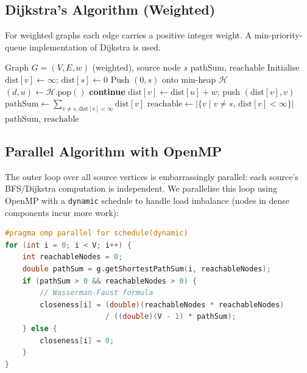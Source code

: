 \documentclass[12pt,a4paper]{article}
\begin{document}
\subsection{Dijkstra's Algorithm (Weighted)}
For weighted graphs each edge carries a positive integer weight.  A min-priority-queue
implementation of Dijkstra is used.

\begin{algorithm}[H]
\caption{Dijkstra-based Closeness Centrality (single source)}
\label{alg:dijkstra}
\begin{algorithmic}[1]
\Require Graph $G=(V,E,w)$ (weighted), source node $s$
\Ensure $\mathrm{pathSum}$, $\mathrm{reachable}$
\State Initialise $\mathrm{dist}[v] \gets \infty$; $\mathrm{dist}[s] \gets 0$
\State Push $(0, s)$ onto min-heap $\mathcal{H}$
  \State $(d, u) \gets \mathcal{H}.\mathrm{pop}()$
   \textbf{continue} \EndIf
      \State $\mathrm{dist}[v] \gets \mathrm{dist}[u] + w$; push $(\mathrm{dist}[v], v)$
    \EndIf
  \EndFor
\EndWhile
\State $\mathrm{pathSum} \gets \sum_{v \neq s, \mathrm{dist}[v] < \infty} \mathrm{dist}[v]$
\State $\mathrm{reachable} \gets |\{v \mid v \neq s,\, \mathrm{dist}[v] < \infty\}|$
\State \Return $\mathrm{pathSum}$, $\mathrm{reachable}$
\end{algorithmic}
\end{algorithm}

\subsection{Parallel Algorithm with OpenMP}
The outer loop over all source vertices is embarrassingly parallel: each source's BFS/Dijkstra
computation is independent.  We parallelise this loop using OpenMP with a \texttt{dynamic}
schedule to handle load imbalance (nodes in dense components incur more work):

\begin{lstlisting}[language=C++, caption={Parallel outer loop in main.cpp}]
#pragma omp parallel for schedule(dynamic)
for (int i = 0; i < V; i++) {
    int reachableNodes = 0;
    double pathSum = g.getShortestPathSum(i, reachableNodes);
    if (pathSum > 0 && reachableNodes > 0) {
        // Wasserman-Faust formula
        closeness[i] = (double)(reachableNodes * reachableNodes)
                       / ((double)(V - 1) * pathSum);
    } else {
        closeness[i] = 0;
    }
}
\end{lstlisting}
\end{document}
